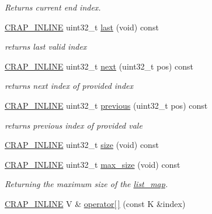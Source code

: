 \begin{DoxyCompactItemize}
\begin{DoxyCompactList}\small\item\em Returns current end index. \end{DoxyCompactList}\item 
\hyperlink{config__x86_8h_a5a40526b8d842e7ff731509998bb0f1c}{C\+R\+A\+P\+\_\+\+I\+N\+L\+I\+N\+E} uint32\+\_\+t \hyperlink{classcrap_1_1list__map_a55b6d10a7a57e6f8a53922beed3ebe74}{last} (void) const 
\begin{DoxyCompactList}\small\item\em returns last valid index \end{DoxyCompactList}\item 
\hyperlink{config__x86_8h_a5a40526b8d842e7ff731509998bb0f1c}{C\+R\+A\+P\+\_\+\+I\+N\+L\+I\+N\+E} uint32\+\_\+t \hyperlink{classcrap_1_1list__map_a31182f073292ecf1dd3bdad4597fcef0}{next} (uint32\+\_\+t pos) const 
\begin{DoxyCompactList}\small\item\em returns next index of provided index \end{DoxyCompactList}\item 
\hyperlink{config__x86_8h_a5a40526b8d842e7ff731509998bb0f1c}{C\+R\+A\+P\+\_\+\+I\+N\+L\+I\+N\+E} uint32\+\_\+t \hyperlink{classcrap_1_1list__map_a6338d92916bc3610d06ce060e5fbdad4}{previous} (uint32\+\_\+t pos) const 
\begin{DoxyCompactList}\small\item\em returns previous index of provided vale \end{DoxyCompactList}\item 
\hyperlink{config__x86_8h_a5a40526b8d842e7ff731509998bb0f1c}{C\+R\+A\+P\+\_\+\+I\+N\+L\+I\+N\+E} uint32\+\_\+t \hyperlink{classcrap_1_1list__map_ae7b0bf2aa79b04cf3c7b884fd8a95a78}{size} (void) const 
\item 
\hyperlink{config__x86_8h_a5a40526b8d842e7ff731509998bb0f1c}{C\+R\+A\+P\+\_\+\+I\+N\+L\+I\+N\+E} uint32\+\_\+t \hyperlink{classcrap_1_1list__map_a4f7e744d8c7f2955ca525c699bdb9065}{max\+\_\+size} (void) const 
\begin{DoxyCompactList}\small\item\em Returning the maximum size of the \hyperlink{classcrap_1_1list__map}{list\+\_\+map}. \end{DoxyCompactList}\item 
\hyperlink{config__x86_8h_a5a40526b8d842e7ff731509998bb0f1c}{C\+R\+A\+P\+\_\+\+I\+N\+L\+I\+N\+E} V \& \hyperlink{classcrap_1_1list__map_a875c67e745b23c87516d824f74b0c5bb}{operator\mbox{[}$\,$\mbox{]}} (const K \&index)

\end{DoxyCompactItemize}
